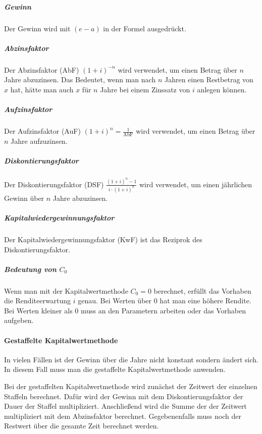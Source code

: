 \documentclass[../main.tex]{subfiles}
\begin{document}
                    \subparagraph{Gewinn}
                        Der Gewinn wird mit $\left(e - a\right)$ in der Formel ausgedrückt.
                    
                    \subparagraph{Abzinsfaktor}
                        Der Abzinsfaktor (AbF) $\left( 1 + i \right)^{-n}$ wird verwendet, um einen Betrag über $n$ Jahre abzuzinsen. Das Bedeutet, wenn man nach $n$ Jahren einen Restbetrag von $x$ hat, hätte man auch $x$ für $n$ Jahre bei einem Zinssatz von $i$ anlegen können.
                        
                    \subparagraph{Aufzinsfaktor}
                        Der Aufzinsfaktor (AuF) $\left( 1 + i \right)^{n} = \frac{1}{\text{AbF}}$ wird verwendet, um einen Betrag über $n$ Jahre aufzuzinsen.
                        
                    \subparagraph{Diskontierungsfaktor}
                        Der Diskontierungsfaktor (DSF) $\frac{\left(1 + i\right)^n - 1}{i \cdot \left( 1 + i \right)^n}$ wird verwendet, um einen jährlichen Gewinn über $n$ Jahre abzuzinsen.
                        
                    \subparagraph{Kapitalwiedergewinnungsfaktor}
                        Der Kapitalwiedergewinnungsfaktor (KwF) ist das Reziprok des Diskontierungsfaktor.
                        
                    \subparagraph{Bedeutung von $C_0$}
                        Wenn man mit der Kapitalwertmethode $C_0 = 0$ berechnet, erfüllt das Vorhaben die Renditeerwartung $i$ genau. Bei Werten über $0$ hat man eine höhere Rendite. Bei Werten kleiner als $0$ muss an den Parametern arbeiten oder das Vorhaben aufgeben.
                        
                \paragraph{Gestaffelte Kapitalwertmethode}
                    In vielen Fällen ist der Gewinn über die Jahre nicht konstant sondern ändert sich. In diesem Fall muss man die gestaffelte Kapitalwertmethode anwenden.
                    
                    Bei der gestaffelten Kapitalwertmethode wird zunächst der Zeitwert der einzelnen Staffeln berechnet. Dafür wird der Gewinn mit dem Diskontierungsfaktor der Dauer der Staffel multipliziert. Anschließend wird die Summe der der Zeitwert multipliziert mit dem Abzinsfaktor berechnet. Gegebenenfalls muss noch der Restwert über die gesamte Zeit berechnet werden.
                    
\end{document}
